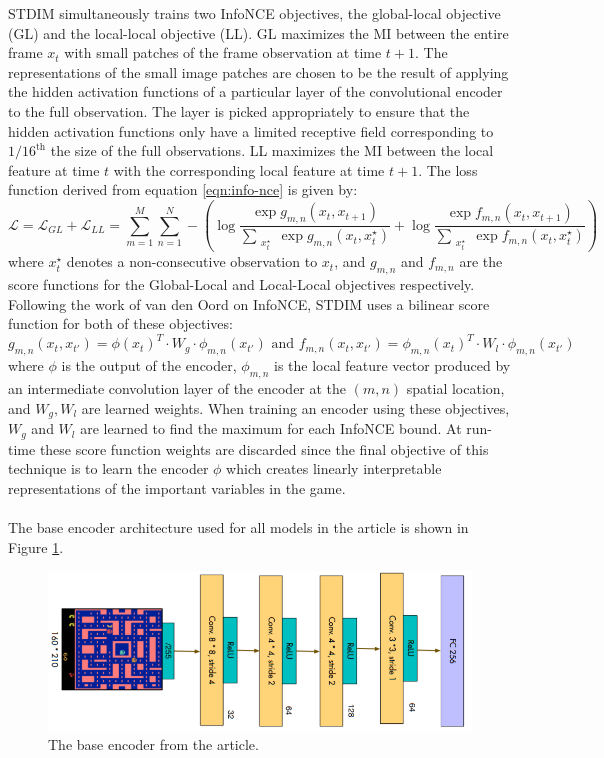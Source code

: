 \documentclass{article}
\begin{document}
STDIM simultaneously trains two InfoNCE objectives, the global-local objective (GL) and the local-local objective (LL). GL maximizes the MI between the entire frame $x_t$ with small patches of the frame observation at time $t+1$. The representations of the small image patches are chosen to be the result of applying the hidden activation functions of a particular layer of the convolutional encoder to the full observation. The layer is picked appropriately to ensure that the hidden activation functions only have a limited receptive field corresponding to $1/16^{\text{th}}$ the size of the full observations. LL maximizes the MI between the local feature at time $t$ with the corresponding local feature at time $t+1$. The loss function derived from equation \ref{eqn:info-nce} is given by:
\begin{equation}
\mathcal{L}=\mathcal{L}_{GL}+\mathcal{L}_{LL}=\sum_{m=1}^M\sum_{n=1}^N-\left(\log{\frac{\exp{g_{m,n}(x_t,x_{t+1})}}{\sum\limits_{\substack{x_t^\star}} \exp{g_{m,n}(x_t,x_t^\star)}}}+\log{\frac{\exp{f_{m,n}(x_t,x_{t+1})}}{\sum\limits_{\substack{x_t^\star}} \exp{f_{m,n}(x_t,x_t^\star)}}}\right)
\label{eqn:loss-functions}
\end{equation}
where $x_t^\star$ denotes a non-consecutive observation to $x_t$, and $g_{m,n}$ and $f_{m,n}$ are the score functions for the Global-Local and Local-Local objectives respectively. Following the work of van den Oord \cite{infoNCE} on InfoNCE, STDIM uses a bilinear score function for both of these objectives: 
\begin{equation}
g_{m,n}(x_t, x_{t'}) = \phi(x_t)^T \cdot W_g \cdot \phi_{m,n}(x_{t'})\text{ and }  f_{m,n}(x_t, x_{t'}) = \phi_{m,n}(x_t)^T\cdot W_l\cdot \phi_{m,n}(x_{t'})
\label{eqn:bilinear}
\end{equation}
where $\phi$ is the output of the encoder, $\phi_{m,n}$ is the local feature vector produced by an intermediate convolution layer of the encoder at the $(m,n)$ spatial location, and $W_g,W_l$ are learned weights. When training an encoder using these objectives, $W_g$ and $W_l$ are learned to find the maximum for each InfoNCE bound. At run-time these score function weights are discarded since the final objective of this technique is to learn the encoder $\phi$ which creates linearly interpretable representations of the important variables in the game.
\\\\
The base encoder architecture used for all models in the article is shown in Figure \ref{fig:base-encoder-image}.
\begin{figure}[H]
    \centering
    \includegraphics[scale=0.75]{base_encoder.PNG}
    \caption{The base encoder from the article.}
    \label{fig:base-encoder-image}
\end{figure}
\end{document}

